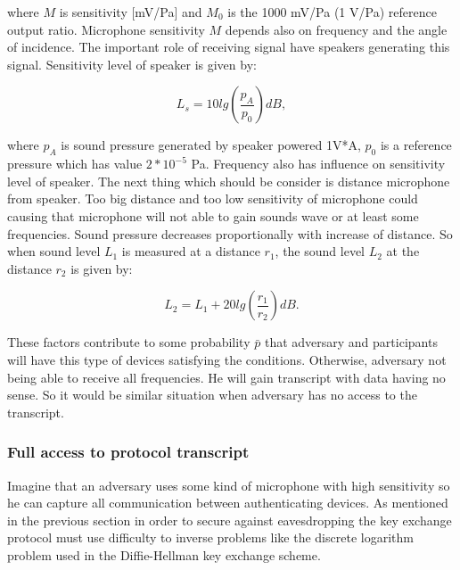 \documentclass[11pt,titlepage]{article}
\theoremstyle{plain}
\begin{document}
where $M$ is sensitivity [mV/Pa] and $M_0$ is the 1000 mV/Pa (1 V/Pa) reference output ratio. Microphone sensitivity $M$ depends also on frequency and the angle of incidence. The important role of receiving signal have speakers generating this signal. Sensitivity level of speaker is given by: 

\begin{equation}
	L_s = 10 lg\left(\frac{p_A}{p_0}\right)dB,
\end{equation}

where $p_A$ is sound pressure generated by speaker powered 1V*A, $p_0$ is a reference pressure which has value $2*10^{-5}$ Pa. Frequency also has influence on sensitivity level of speaker. The next thing which should be consider is distance microphone from speaker. Too big distance and too low sensitivity of microphone could causing that microphone will not able to gain sounds wave or at least some frequencies. Sound pressure decreases proportionally with increase of distance. So when sound level $L_{1}$ is measured at a distance $r_1$, the sound level $L_2$ at the distance $r_2$ is given by:

\begin{equation}
	L_2 = L_1 + 20 lg \left(\frac{r_1}{r_2}\right)dB.
\end{equation}

These factors contribute to some probability $\bar{p}$ that adversary and participants will have this type of devices satisfying the conditions. Otherwise, adversary not being able to receive all frequencies. He will gain transcript with data having no sense. So it would be similar situation when adversary has no access to the transcript.  


\subsubsection{Full access to protocol transcript}
Imagine that an adversary uses some kind of microphone with high sensitivity so he can capture all communication between authenticating devices. As mentioned in the previous section in order to secure against eavesdropping the key exchange protocol must use difficulty to inverse problems like the discrete logarithm problem used in the Diffie-Hellman key exchange scheme.
\end{document}
